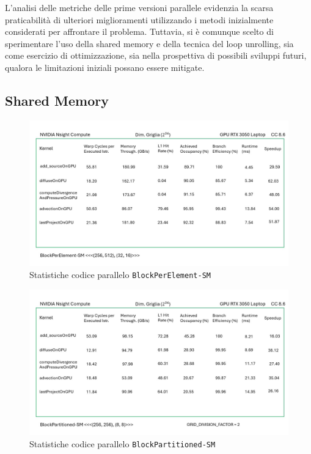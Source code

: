 \documentclass[12pt,a4paper,openany,twoside]{article}
\begin{document}
L'analisi delle metriche delle prime versioni parallele evidenzia la scarsa praticabilità di ulteriori miglioramenti utilizzando i metodi inizialmente considerati per affrontare il problema. Tuttavia, si è comunque scelto di sperimentare l'uso della shared memory e della tecnica del loop unrolling, sia come esercizio di ottimizzazione, sia nella prospettiva di possibili sviluppi futuri, qualora le limitazioni iniziali possano essere mitigate.

\subsection{Shared Memory}
\begin{figure}
    \centering
    \includegraphics[width=0.75\linewidth]{figures/Slide6.jpg}
    \caption{Statistiche codice parallelo \texttt{BlockPerElement-SM}}
    \label{fig:6}
\end{figure}


\begin{figure} 
    \centering
    \includegraphics[width=0.75\linewidth]{figures/Slide7.jpg}
    \caption{Statistiche codice parallelo \texttt{BlockPartitioned-SM}}
    \label{fig:7}
\end{figure}
\end{document}
